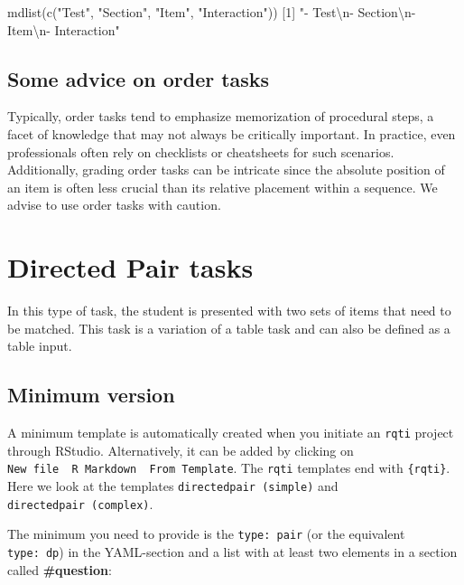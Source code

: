 \documentclass[twoside]{tufte-book}
\newenvironment{Shaded}{}{}
\newcommand{\DecValTok}[1]{\textcolor[rgb]{0.25,0.63,0.44}{#1}}
\newcommand{\FunctionTok}[1]{\textcolor[rgb]{0.02,0.16,0.49}{#1}}
\newcommand{\NormalTok}[1]{#1}
\newcommand{\SpecialCharTok}[1]{\textcolor[rgb]{0.25,0.44,0.63}{#1}}
\newcommand{\StringTok}[1]{\textcolor[rgb]{0.25,0.44,0.63}{#1}}
\begin{document}
\begin{Shaded}
\begin{Highlighting}[]
\FunctionTok{mdlist}\NormalTok{(}\FunctionTok{c}\NormalTok{(}\StringTok{"Test"}\NormalTok{, }\StringTok{"Section"}\NormalTok{, }\StringTok{"Item"}\NormalTok{, }\StringTok{"Interaction"}\NormalTok{))}
\NormalTok{[}\DecValTok{1}\NormalTok{] }\StringTok{"{-} Test}\SpecialCharTok{\textbackslash{}n}\StringTok{{-} Section}\SpecialCharTok{\textbackslash{}n}\StringTok{{-} Item}\SpecialCharTok{\textbackslash{}n}\StringTok{{-} Interaction"}
\end{Highlighting}
\end{Shaded}

\section{Some advice on order tasks}\label{some-advice-on-order-tasks}

Typically, order tasks tend to emphasize memorization of procedural steps, a facet of knowledge that may not always be critically important. In practice, even professionals often rely on checklists or cheatsheets for such scenarios. Additionally, grading order tasks can be intricate since the absolute position of an item is often less crucial than its relative placement within a sequence. We advise to use order tasks with caution.

\chapter{Directed Pair tasks}\label{directed-pair-tasks}

In this type of task, the student is presented with two sets of items that need to be matched. This task is a variation of a table task and can also be defined as a table input.

\section{Minimum version}\label{minimum-version-6}
A minimum template is automatically created when you initiate an \texttt{rqti} project through RStudio. Alternatively, it can be added by clicking on \texttt{New\ file\ \textrightarrow{}\ R\ Markdown\ \textrightarrow{}\ From\ Template}. The \texttt{rqti} templates end with \texttt{\{rqti\}}. Here we look at the templates \texttt{directedpair\ (simple)} and \texttt{directedpair\ (complex)}.

The minimum you need to provide is the \texttt{type:\ pair} (or the equivalent \texttt{type:\ dp}) in the YAML-section and a list with at least two elements in a section called \textbf{\#question}:
\end{document}
